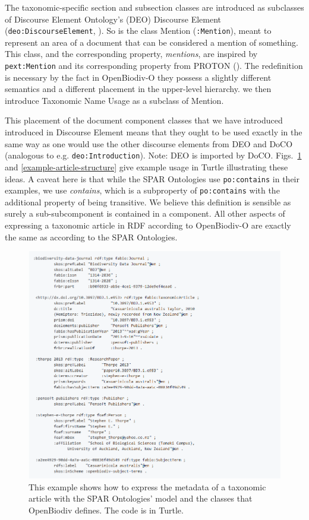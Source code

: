 The taxonomic-specific section and subsection classes are introduced as subclasses of Discourse Element Ontology's (DEO) Discourse Element ({\tt deo:DiscourseElement},  \cite{constantin_document_2016}). So is the class Mention ({\tt :Mention}), meant to represent an area of a document that can be considered a mention of something. This class, and the corresponding property, \emph{mentions}, are inspired by {\tt pext:Mention} and its corresponding property from PROTON (\cite{damova_mapping_2010}). The redefinition is necessary by the fact in \mbox{OpenBiodiv-O} they possess a slightly different semantics and a different placement in the upper-level hierarchy. we then introduce Taxonomic Name Usage as a subclass of Mention.

This placement of the document component classes that we have introduced introduced in Discourse Element means that they ought to be used exactly in the same way as one would use the other discourse elements from DEO and DoCO (analogous to e.g. {\tt deo:Introduction}). Note: DEO is imported by DoCO. Figs.~\ref{example-article-metadata} and \ref{example-article-structure} give example usage in Turtle illustrating these ideas. A caveat here is that while the SPAR Ontologies use {\tt po:contains} in their examples, we use \emph{contains}, which is a subproperty of {\tt po:contains} with the additional property of being transitive. We believe this definition is sensible as surely a sub-subcomponent is contained in a component. All other aspects of expressing a taxonomic article in RDF according to \mbox{OpenBiodiv-O} are exactly the same as according to the SPAR Ontologies.

\begin{figure}[h!]
	\centering
	\includegraphics[width=\textwidth]{Figures/example-article-metadata}
	\decoRule
  \caption[Example article metadata.]{This example shows how to express the metadata of a taxonomic article with the SPAR Ontologies' model and the classes that OpenBiodiv defines. The code is in Turtle.}
  \label{example-article-metadata}
\end{figure}

